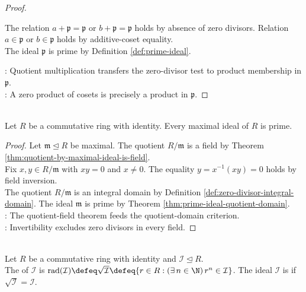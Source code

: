 \begin{theorem}
\begin{proof}
\begin{enumerate}[label=\roman*.]
The relation $a+\mathfrak{p}=\mathfrak{p}$ or $b+\mathfrak{p}=\mathfrak{p}$ holds by absence of zero divisors. Relation $a\in\mathfrak{p}$ or $b\in\mathfrak{p}$ holds by additive-coset equality.\\
The ideal $\mathfrak{p}$ is prime by Definition \ref{def:prime-ideal}.
\end{enumerate}
: Quotient multiplication transfers the zero-divisor test to product membership in $\mathfrak{p}$.\\
: A zero product of cosets is precisely a product in $\mathfrak{p}$.
\end{proof}
\end{theorem}

\begin{corollary} \label{cor:maximal-ideals-are-prime} \\
Let $R$ be a commutative ring with identity. Every maximal ideal of $R$ is prime.
\begin{proof}
Let $\mathfrak{m}\trianglelefteq R$ be maximal. The quotient $R/\mathfrak{m}$ is a field by Theorem \ref{thm:quotient-by-maximal-ideal-is-field}.\\
Fix $x,y\in R/\mathfrak{m}$ with $xy=0$ and $x\neq0$. The equality $y=x^{-1}(xy)=0$ holds by field inversion.\\
The quotient $R/\mathfrak{m}$ is an integral domain by Definition \ref{def:zero-divisor-integral-domain}. The ideal $\mathfrak{m}$ is prime by Theorem \ref{thm:prime-ideal-quotient-domain}.\\
: The quotient-field theorem feeds the quotient-domain criterion.\\
: Invertibility excludes zero divisors in every field.
\end{proof}
\end{corollary}

\begin{definition} \label{def:ideal-radical} \\
Let $R$ be a commutative ring with identity and $\mathcal{I}\trianglelefteq R$.\\
The  of $\mathcal{I}$ is $\operatorname{rad}(\mathcal{I})\defeq\sqrt{\mathcal{I}}\defeq\{r\in R:(\exists\,n\in\N)\,r^n\in\mathcal{I}\}$. The ideal $\mathcal{I}$ is  if $\sqrt{\mathcal{I}}=\mathcal{I}$.
\end{definition}

